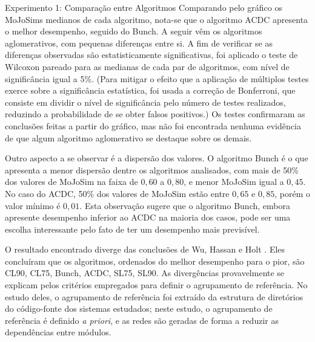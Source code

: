 \begin{section}{Experimento 1: Comparação entre Algoritmos}
Comparando pelo gráfico os MoJoSims medianos de cada algoritmo, nota-se que o algoritmo ACDC apresenta o melhor desempenho, seguido do Bunch. A seguir vêm os algoritmos aglomerativos, com pequenas diferenças entre si. A fim de verificar se as diferenças observadas são estatisticamente significativas, foi aplicado o teste de Wilcoxon pareado para as medianas de cada par de algoritmos, com nível de significância igual a 5\%. (Para mitigar o efeito que a aplicação de múltiplos testes exerce sobre a significância estatística, foi usada a correção de Bonferroni, que consiste em dividir o nível de significância pelo número de testes realizados, reduzindo a probabilidade de se obter falsos positivos.) Os testes confirmaram as conclusões feitas a partir do gráfico, mas não foi encontrada nenhuma evidência de que algum algoritmo aglomerativo se destaque sobre os demais.



Outro aspecto a se observar é a dispersão dos valores. O algoritmo Bunch é o que apresenta a menor dispersão dentre os algoritmos analisados, com mais de 50\% dos valores de MoJoSim na faixa de $0,60$ a $0,80$, e menor MoJoSim igual a $0,45$. No caso do ACDC, 50\% dos valores de MoJoSim estão entre $0,65$ e $0,85$, porém o valor mínimo é $0,01$. Esta observação sugere que o algoritmo Bunch, embora apresente desempenho inferior ao ACDC na maioria dos casos, pode ser uma escolha interessante pelo fato de ter um desempenho mais previsível.

O resultado encontrado diverge das conclusões de Wu, Hassan e Holt \cite{Wu2005}. Eles concluíram que os algoritmos, ordenados do melhor desempenho para o pior, são CL90, CL75, Bunch, ACDC, SL75, SL90. As divergências provavelmente se explicam pelos critérios empregados para definir o agrupamento de referência. No estudo deles, o agrupamento de referência foi extraído da estrutura de diretórios do código-fonte dos sistemas estudados; neste estudo, o agrupamento de referência é definido \emph{a priori}, e as redes são geradas de forma a reduzir as dependências entre módulos.


\end{section}
